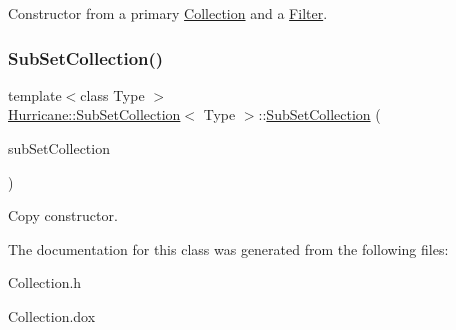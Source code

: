 Constructor from a primary \mbox{\hyperlink{classHurricane_1_1Collection}{Collection}} and a \mbox{\hyperlink{classHurricane_1_1Filter}{Filter}}. \mbox{\label{classHurricane_1_1SubSetCollection_ad4e0bd9554d898f3991585758dbf2aac}} 
\subsubsection{\texorpdfstring{Sub\+Set\+Collection()}{SubSetCollection()}\hspace{0.1cm}{\footnotesize\ttfamily [2/2]}}
{\footnotesize\ttfamily template$<$class Type $>$ \\
\mbox{\hyperlink{classHurricane_1_1SubSetCollection}{Hurricane\+::\+Sub\+Set\+Collection}}$<$ Type $>$\+::\mbox{\hyperlink{classHurricane_1_1SubSetCollection}{Sub\+Set\+Collection}} (\begin{DoxyParamCaption}\item[{const \mbox{\hyperlink{classHurricane_1_1SubSetCollection}{Sub\+Set\+Collection}}$<$ Type $>$ \&}]{sub\+Set\+Collection }\end{DoxyParamCaption})\hspace{0.3cm}{\ttfamily [inline]}}

Copy constructor. 

The documentation for this class was generated from the following files\+:\begin{DoxyCompactItemize}
\item 
Collection.\+h\item 
Collection.\+dox\end{DoxyCompactItemize}
